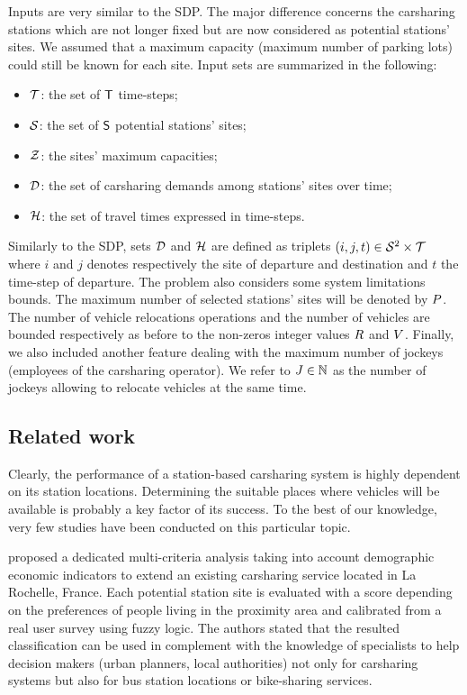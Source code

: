 \begin{bibunit}[ieeetr]
\medskip
Inputs are very similar to the SDP.
The major difference concerns the carsharing stations which are not longer fixed but are now considered as potential stations' sites.
We assumed that a maximum capacity (\ie maximum number of parking lots) could still be known for each site.
Input sets are summarized in the following:
\begin{itemize}
\item $\mathcal{T}$: the set of $\mathsf{T}$ time-steps;
\item $\mathcal{S}$: the set of $\mathsf{S}$ potential stations' sites;
\item $\mathcal{Z}$: the sites' maximum capacities;
\item $\mathcal{D}$: the set of carsharing demands among stations' sites over time;
\item $\mathcal{H}$: the set of travel times expressed in time-steps.
\end{itemize}
Similarly to the SDP, sets $\mathcal{D}$ and $\mathcal{H}$ are defined as triplets $(i,j,t) \in \mathcal{S}^2 \times \mathcal{T}$ where $i$ and $j$ denotes respectively the site of departure and destination and $t$ the time-step of departure.
The problem also considers some system limitations bounds.
The maximum number of selected stations' sites will be denoted by $P$.
The number of vehicle relocations operations and the number of vehicles are bounded respectively as before to the non-zeros integer values $R$ and $V$.
Finally, we also included another feature dealing with the maximum number of jockeys (employees of the carsharing operator).
We refer to $J \in \mathbb{N}$ as the number of jockeys allowing to relocate vehicles at the same time.


\subsection{Related work}

Clearly, the performance of a station-based carsharing system is highly dependent on its station locations.
Determining the suitable places where vehicles will be available is probably a key factor of its success.
To the best of our knowledge, very few studies have been conducted on this particular topic.

\medskip
\cite{ion_site_2009} proposed a dedicated multi-criteria analysis taking into account demographic economic indicators to extend an existing carsharing service located in La Rochelle, France.
Each potential station site is evaluated with a score depending on the preferences of people living in the proximity area and calibrated from a real user survey using fuzzy logic.
The authors stated that the resulted classification can be used in complement with the knowledge of specialists to help decision makers (urban planners, local authorities) not only for carsharing systems but also for bus station locations or bike-sharing services.



\end{bibunit}
